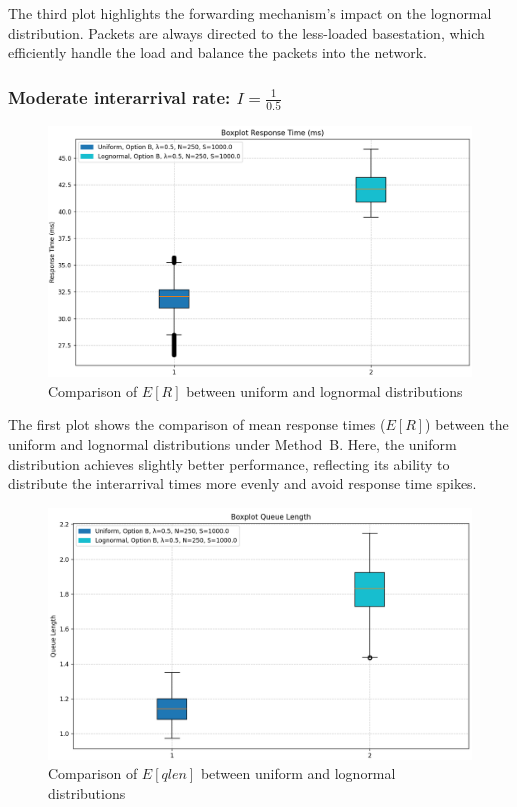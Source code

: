 \documentclass{report}
\begin{document}
\begin{flushleft}
The third plot highlights the forwarding mechanism's impact on the lognormal distribution. Packets are always directed to the less-loaded basestation, which efficiently handle the load and balance the packets into the network.
\end{flushleft}

\subsubsection*{Moderate interarrival rate: $I = \frac{1}{0.5}$}
\begin{figure}[H]
    \centering
    \includegraphics[width=\textwidth]{img/plots/I-vary/R_B_I05.png}
    \caption{Comparison of $E[R]$ between uniform and lognormal distributions}
\end{figure}

\begin{flushleft}
The first plot shows the comparison of mean response times ($E[R]$) between the uniform and lognormal distributions under Method~B. Here, the uniform distribution achieves slightly better performance, reflecting its ability to distribute the interarrival times more evenly and avoid response time spikes.
\end{flushleft}

\begin{figure}[H]
    \centering
    \includegraphics[width=\textwidth]{img/plots/I-vary/Q_B_I05.png}
    \caption{Comparison of $E[qlen]$ between uniform and lognormal distributions}
\end{figure}
\end{document}
